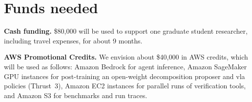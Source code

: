 \section{Funds needed}

\textbf{Cash funding.} {\$80,000} will be used to support one graduate student researcher, including travel expenses, for about 9 months. 

\textbf{AWS Promotional Credits.} We envision about {\$40,000} in AWS credits, which will be used as follows: Amazon Bedrock for agent inference, Amazon SageMaker GPU instances for post-training an open-weight decomposition proposer and \gls{vla} policies (Thrust~3), Amazon EC2 instances for parallel runs of verification tools, and Amazon S3 for benchmarks and run traces.

